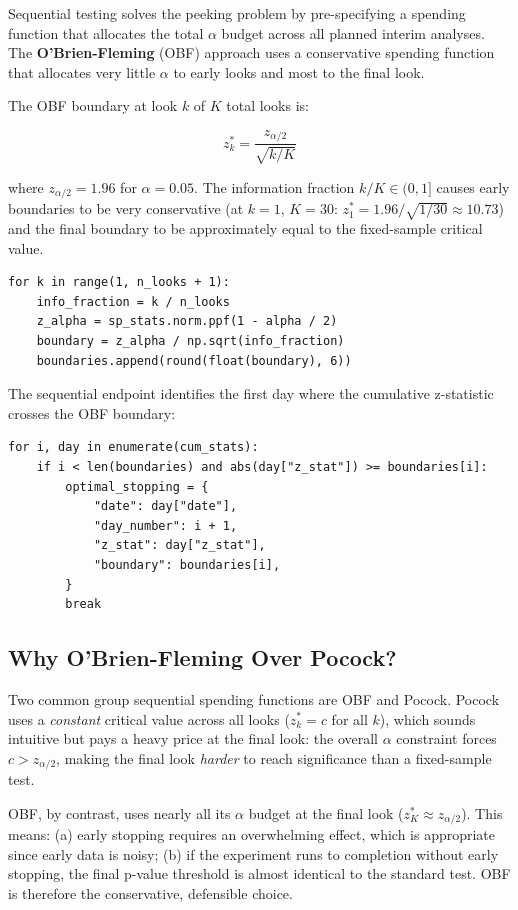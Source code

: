 Sequential testing solves the peeking problem by pre-specifying a spending
function that allocates the total $\alpha$ budget across all planned interim
analyses. The \textbf{O'Brien-Fleming} (OBF) approach uses a conservative
spending function that allocates very little $\alpha$ to early looks and most
to the final look.

The OBF boundary at look $k$ of $K$ total looks is:

\begin{equation}
  z_k^* = \frac{z_{\alpha/2}}{\sqrt{k/K}}
  \label{eq:obf}
\end{equation}

where $z_{\alpha/2} = 1.96$ for $\alpha = 0.05$. The information fraction
$k/K \in (0, 1]$ causes early boundaries to be very conservative (at
$k=1$, $K=30$: $z_1^* = 1.96 / \sqrt{1/30} \approx 10.73$) and the final
boundary to be approximately equal to the fixed-sample critical value.

\begin{lstlisting}[style=python, caption={OBF boundaries (stats\_engine.py lines 431--438)}]
for k in range(1, n_looks + 1):
    info_fraction = k / n_looks
    z_alpha = sp_stats.norm.ppf(1 - alpha / 2)
    boundary = z_alpha / np.sqrt(info_fraction)
    boundaries.append(round(float(boundary), 6))
\end{lstlisting}

The sequential endpoint identifies the first day where the cumulative z-statistic
crosses the OBF boundary:

\begin{lstlisting}[style=python, caption={Optimal stopping detection (routers/sequential.py lines 62--70)}]
for i, day in enumerate(cum_stats):
    if i < len(boundaries) and abs(day["z_stat"]) >= boundaries[i]:
        optimal_stopping = {
            "date": day["date"],
            "day_number": i + 1,
            "z_stat": day["z_stat"],
            "boundary": boundaries[i],
        }
        break
\end{lstlisting}

\subsection{Why O'Brien-Fleming Over Pocock?}

\begin{decisionbox}
  Two common group sequential spending functions are OBF and Pocock.
  Pocock uses a \emph{constant} critical value across all looks
  ($z_k^* = c$ for all $k$), which sounds intuitive but pays a heavy price
  at the final look: the overall $\alpha$ constraint forces $c > z_{\alpha/2}$,
  making the final look \emph{harder} to reach significance than a
  fixed-sample test.

  OBF, by contrast, uses nearly all its $\alpha$ budget at the final look
  ($z_K^* \approx z_{\alpha/2}$). This means: (a) early stopping requires an
  overwhelming effect, which is appropriate since early data is noisy; (b) if
  the experiment runs to completion without early stopping, the final p-value
  threshold is almost identical to the standard test. OBF is therefore the
  conservative, defensible choice.
\end{decisionbox}

